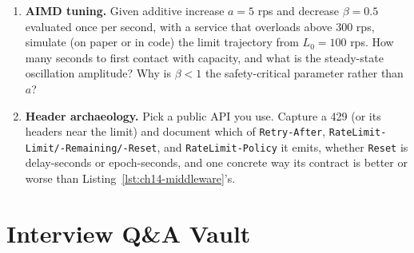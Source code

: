 \begin{enumerate}[label=\textbf{E14.\arabic*.}, leftmargin=2.2cm]
        two?), and the \texttt{GET /v1/usage} response body. What happens
        to a client at 99/100 whose per-second bucket is also empty?
  \item \textbf{AIMD tuning.} Given additive increase $a = 5$ rps and
        decrease $\beta = 0.5$ evaluated once per second, with a service
        that overloads above 300 rps, simulate (on paper or in code) the
        limit trajectory from $L_0 = 100$ rps. How many seconds to first
        contact with capacity, and what is the steady-state oscillation
        amplitude? Why is $\beta < 1$ the safety-critical parameter rather
        than $a$?
  \item \textbf{Header archaeology.} Pick a public API you use. Capture a
        429 (or its headers near the limit) and document which of
        \texttt{Retry-After}, \texttt{RateLimit-Limit/-Remaining/-Reset},
        and \texttt{RateLimit-Policy} it emits, whether \texttt{Reset} is
        delay-seconds or epoch-seconds, and one concrete way its contract
        is better or worse than Listing~\ref{lst:ch14-middleware}'s.
\end{enumerate}
\section{Interview Q\&A Vault}
\label{sec:ch14-interview}

